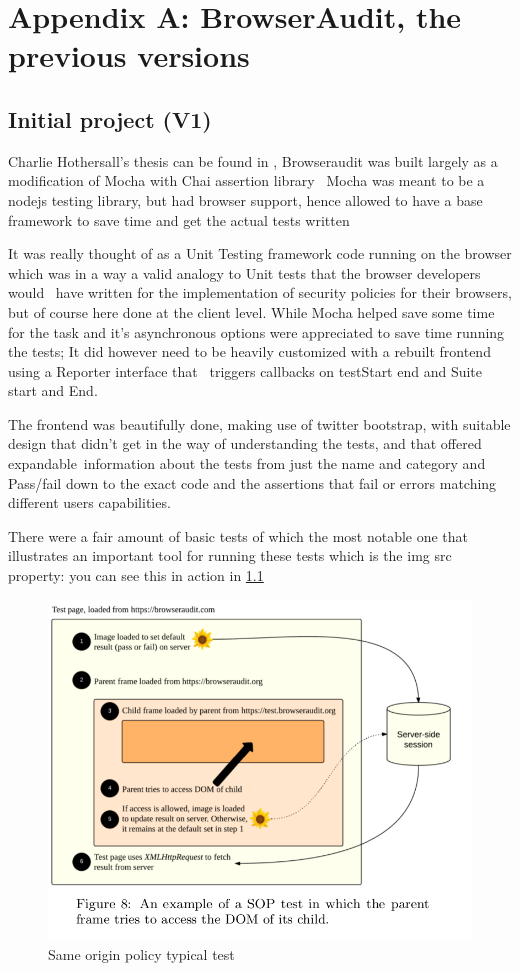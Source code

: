 \chapter{Appendix A:  BrowserAudit, the previous versions}
\label{app:A}

\section{Initial project (V1)}

Charlie Hothersall's thesis can be found in \cite{charlie} , Browseraudit was built largely as a modification of Mocha with Chai assertion library \
Mocha was meant to be a nodejs testing library, but had browser support, hence allowed to have a base framework to save time and get the actual tests written \

It was really thought of as a Unit Testing framework code running on the browser which was in a way a valid analogy to Unit tests that the browser developers would \
have written for the implementation of security policies for their browsers, but of course here done at the client level. While Mocha helped save some time for the task and
it's asynchronous options were appreciated to save time running the tests; It did however need to be heavily customized with a rebuilt frontend using a Reporter interface that \
triggers callbacks on testStart end and Suite start and End.\ 

The frontend was beautifully done, making use of twitter bootstrap, with suitable design that didn't get in the way of understanding the tests, and that offered expandable\
information about the tests from just the name and category and Pass/fail down to the exact code and the assertions that fail or errors matching different users capabilities.\

There were a fair amount of basic tests of which the most notable one that illustrates an important tool for running these tests which is the img src property:
you can see this in action in \ref{fig:sop} 

\begin{figure}
\centering
\includegraphics[width=1\textwidth]{./SOPbasic.png}
\caption{\label{fig:sop}Same origin policy typical test}
\end{figure}

